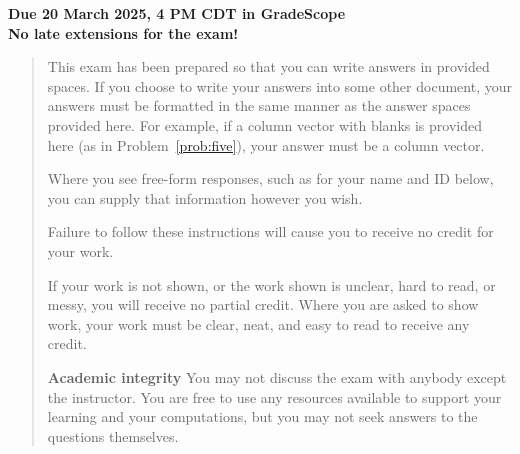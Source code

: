 \documentclass[12pt]{article}
\begin{document}

\begin{center}\bf
Due 20 March 2025, 4 PM CDT in GradeScope\\
No late extensions for the exam!
\end{center}
\begin{quote}
    This exam has been prepared so that you can write answers in provided spaces.  If you choose to write your answers into some other document, your answers must be formatted in the same manner as the answer spaces provided here. For example, if a column vector with blanks is provided here (as in Problem~\ref{prob:five}), your answer must be a column vector.

    Where you see free-form responses, such as for your name and ID below, you can supply that information however you wish.

    Failure to follow these instructions will cause you to receive no credit for your work.

    If your work is not shown, or the work shown is unclear, hard to read, or messy, you will receive no partial credit.   Where you are asked to show work, your work must be clear, neat, and easy to read to receive any credit.

    {\bf Academic integrity} You may not discuss the exam with anybody except the instructor. You are free to use any resources available to support your learning and your computations, but you may not seek answers to the questions themselves.
\end{quote}
\end{document}
